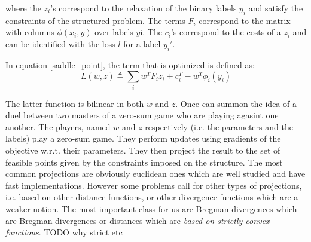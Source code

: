 where the $ z_i$'s correspond to the relaxation of the binary labels $y_i$ and
satisfy the constraints of the structured problem. The terms $ F_i$ correspond
to the matrix with columns $\phi( x_i, y)$ over labels $ y$i. The $ c_i$'s
correspond to the costs of a $ z_i$ and can be identified with the loss $l$ for
a label $ y_i'$.

In equation \ref{saddle_point}, the term that is optimized is defined as:
\begin{equation}
  {L}( w, z) \triangleq \sum_i w^T F_i z_i + c_i^T - w^T \phi_i( y_i)
  \label{saddle_obj}
\end{equation}


\clearpage

The latter function is bilinear in both $w$ and $z$. Once can summon the idea of
a duel between two masters of a zero-sum game who are playing agasint one
another. The players, named $w$ and $z$ 
respectively (i.e. the parameters and the labels) play a zero-sum game. They
perform updates using gradients of the objective w.r.t. their parameters. They
then project the result to the set of feasible points given by the constraints
imposed on the structure. The most common projections are obviously euclidean
ones which are well studied and have fast implementations. However some problems
call for other types of projections, i.e. based on other distance functions, or
other divergence functions which are a weaker notion. The most important class
for us are Bregman divergences which are Bregman divergences or distances which
are \emph{based on strictly convex functions}. TODO why strict etc

